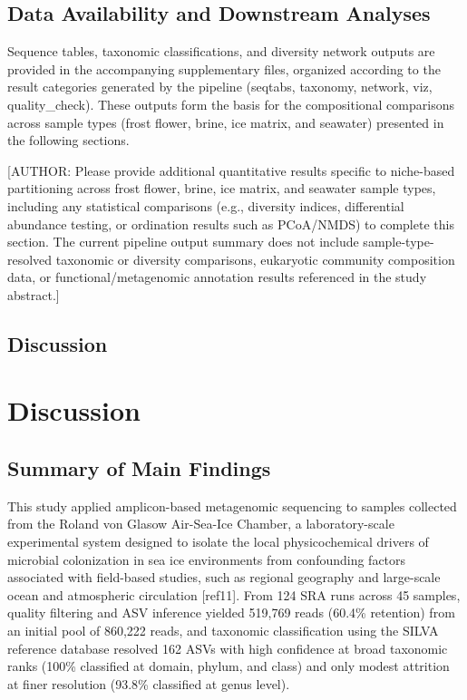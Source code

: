 \documentclass[
  11pt,
]{article}
\begin{document}
\subsection{Data Availability and Downstream
Analyses}\label{data-availability-and-downstream-analyses}

Sequence tables, taxonomic classifications, and diversity network
outputs are provided in the accompanying supplementary files, organized
according to the result categories generated by the pipeline (seqtabs,
taxonomy, network, viz, quality\_check). These outputs form the basis
for the compositional comparisons across sample types (frost flower,
brine, ice matrix, and seawater) presented in the following sections.

{[}AUTHOR: Please provide additional quantitative results specific to
niche-based partitioning across frost flower, brine, ice matrix, and
seawater sample types, including any statistical comparisons (e.g.,
diversity indices, differential abundance testing, or ordination results
such as PCoA/NMDS) to complete this section. The current pipeline output
summary does not include sample-type-resolved taxonomic or diversity
comparisons, eukaryotic community composition data, or
functional/metagenomic annotation results referenced in the study
abstract.{]}

\subsection{Discussion}\label{discussion}

\section{Discussion}\label{discussion-1}

\subsection{Summary of Main Findings}\label{summary-of-main-findings}

This study applied amplicon-based metagenomic sequencing to samples
collected from the Roland von Glasow Air-Sea-Ice Chamber, a
laboratory-scale experimental system designed to isolate the local
physicochemical drivers of microbial colonization in sea ice
environments from confounding factors associated with field-based
studies, such as regional geography and large-scale ocean and
atmospheric circulation {[}ref11{]}. From 124 SRA runs across 45
samples, quality filtering and ASV inference yielded 519,769 reads
(60.4\% retention) from an initial pool of 860,222 reads, and taxonomic
classification using the SILVA reference database resolved 162 ASVs with
high confidence at broad taxonomic ranks (100\% classified at domain,
phylum, and class) and only modest attrition at finer resolution (93.8\%
classified at genus level).
\end{document}
